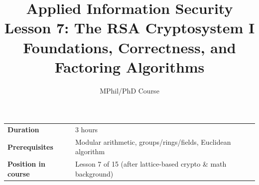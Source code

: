 \documentclass[11pt]{article}
\title{\textbf{Applied Information Security} \\ \Large Lesson 7: The RSA Cryptosystem I \\ \large Foundations, Correctness, and Factoring Algorithms}
\author{MPhil/PhD Course}
\date{}
\begin{document}
\maketitle

\begin{center}
\begin{tabular}{ll}
\toprule
\textbf{Duration} & 3 hours \\
\textbf{Prerequisites} & Modular arithmetic, groups/rings/fields, Euclidean algorithm \\
\textbf{Position in course} & Lesson 7 of 15 (after lattice-based crypto \& math background) \\
\bottomrule
\end{tabular}
\end{center}

\tableofcontents
\newpage


\end{document}
